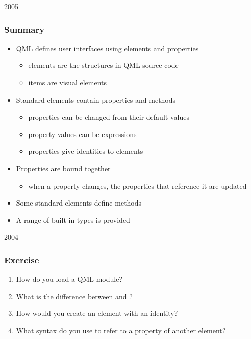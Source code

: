 \begin{slide}{2005}\frametitle{Summary}

\begin{itemize}
\item QML defines user interfaces using elements and properties
  \begin{itemize}
  \item elements are the structures in QML source code
  \item items are visual elements
  \end{itemize}
\item Standard elements contain properties and methods
  \begin{itemize}
  \item properties can be changed from their default values
  \item property values can be expressions
  \item {} properties give identities to elements
  \end{itemize}
\item Properties are bound together
  \begin{itemize}
  \item when a property changes, the properties that reference it are updated
  \end{itemize}
\item Some standard elements define methods
\item A range of built-in types is provided
\end{itemize}


\end{slide}

                                   

\begin{slide}{2004}\frametitle{Exercise}

\begin{enumerate}
\item How do you load a QML module?
\item What is the difference between  and ?
\item How would you create an element with an identity?
\item What syntax do you use to refer to a property of another element?
\end{enumerate}

\end{slide}


